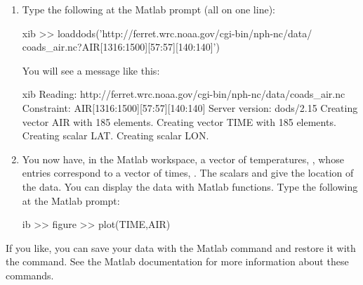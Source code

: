 \begin{enumerate}
\item Type the following at the Matlab prompt (all on one line):

\begin{vcode}{xib}
>> loaddods('http://ferret.wrc.noaa.gov/cgi-bin/nph-nc/data/
coads_air.nc?AIR[1316:1500][57:57][140:140]')
\end{vcode}

You will see a message like this:

\begin{vcode}{xib}
Reading: http://ferret.wrc.noaa.gov/cgi-bin/nph-nc/data/coads_air.nc
  Constraint: AIR[1316:1500][57:57][140:140]
Server version: dods/2.15
Creating vector AIR with 185 elements.
Creating vector TIME with 185 elements.
Creating scalar LAT.
Creating scalar LON.
\end{vcode}

\item You now have, in the Matlab workspace, a vector of temperatures,
  , whose entries correspond to a vector of times,
  . The scalars  and  give the location of
  the data. You can display the data with Matlab functions. Type the
  following at the Matlab prompt:

\begin{vcode}{ib}
>> figure
>> plot(TIME,AIR)
\end{vcode}

\end{enumerate}


If you like, you can save your data with the Matlab  command
and restore it with the  command. See the Matlab
documentation for more information about these commands.  

